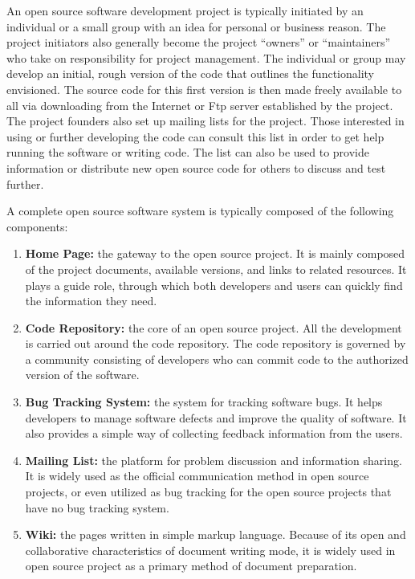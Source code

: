 \documentclass[draftclsnofoot,journal,onecolumn,12pt]{IEEEtran}
\begin{document}
An open source software development project is typically initiated by an individual or a small group with an idea for personal or business reason. The project initiators also generally become the project “owners” or “maintainers” who take on responsibility for project management. The individual or group may develop an initial, rough version of the code that outlines the functionality envisioned. The source code for this first version is then made freely available to all via downloading from the Internet or Ftp server established by the project. The project founders also set up mailing lists for the project. Those interested in using or further developing the code can consult this list in order to get help running the software or writing code. The list can also be used to provide information or distribute new open source code for others to discuss and test further.

%
A complete open source software system is typically composed of the following components:
\begin{enumerate}
  \item \textbf{Home Page:} the gateway to the open source project. It is mainly composed of the project documents, available versions, and links to related resources. It plays a guide role, through which both developers and users can quickly find the information they need.
  \item \textbf{Code Repository:} the core of an open source project. All the development is carried out around the code repository. The code repository is governed by a community consisting of developers who can commit code to the authorized version of the software.
  \item \textbf{Bug Tracking System:} the system for tracking software bugs. It helps developers to manage software defects and improve the quality of software. It also provides a simple way of collecting feedback information from the users.
  \item \textbf{Mailing List:} the platform for problem discussion and information sharing. It is widely used as the official communication method in open source projects, or even utilized as bug tracking for the open source projects that have no bug tracking system.
  \item \textbf{Wiki:} the pages written in simple markup language. Because of its open and collaborative characteristics of document writing mode, it is widely used in open source project as a primary method of document preparation.
\end{enumerate}
\end{document}
